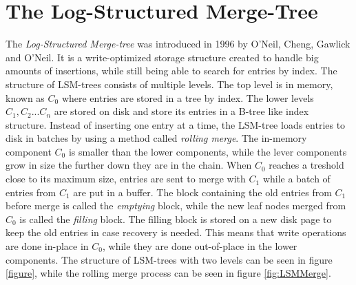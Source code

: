 \section{The Log-Structured Merge-Tree}
The \emph{Log-Structured Merge-tree} was introduced in 1996 by O'Neil, Cheng, Gawlick and O'Neil\cite{LSMTree}. It is a write-optimized storage structure created to handle big amounts of insertions, while still being able to search for entries by index. The structure of LSM-trees consists of multiple levels. The top level is in memory, known as $C_0$ where entries are stored in a tree by index. The lower levels $C_1, C_2 ... C_n$ are stored on disk and store its entries in a B-tree like index structure. Instead of inserting one entry at a time, the LSM-tree loads entries to disk in batches by using a method called \emph{rolling merge}. The in-memory component $C_0$ is smaller than the lower components, while the lever components grow in size the further down they are in the chain. When $C_0$ reaches a treshold close to its maximum size, entries are sent to merge with $C_1$ while a batch of entries from $C_1$ are put in a buffer. The block containing the old entries from $C_1$ before merge is called the \emph{emptying} block, while the new leaf nodes merged from $C_0$ is called the \emph{filling} block. The filling block is stored on a new disk page to keep the old entries in case recovery is needed. This means that write operations are done in-place in $C_0$, while they are done out-of-place in the lower components. The structure of LSM-trees with two levels can be seen in figure \ref{figure}, while the rolling merge process can be seen in figure \ref{fig:LSMMerge}. 


